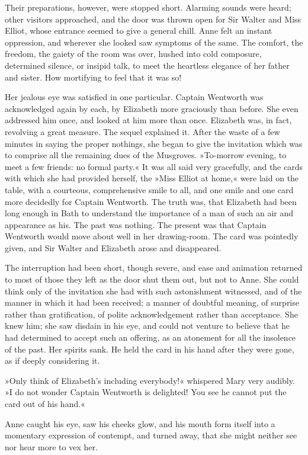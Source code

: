Their preparations, however, were stopped short. Alarming sounds were heard; other visitors approached, and the door was thrown open for Sir Walter and Miss Elliot, whose entrance seemed to give a general chill. Anne felt an instant oppression, and wherever she looked saw symptoms of the same. The comfort, the freedom, the gaiety of the room was over, hushed into cold composure, determined silence, or insipid talk, to meet the heartless elegance of her father and sister. How mortifying to feel that it was so!

Her jealous eye was satisfied in one particular. Captain Wentworth was acknowledged again by each, by Elizabeth more graciously than before. She even addressed him once, and looked at him more than once. Elizabeth was, in fact, revolving a great measure. The sequel explained it. After the waste of a few minutes in saying the proper nothings, she began to give the invitation which was to comprise all the remaining dues of the Musgroves. »To-morrow evening, to meet a few friends: no formal party.« It was all said very gracefully, and the cards with which she had provided herself, the »Miss Elliot at home,« were laid on the table, with a courteous, comprehensive smile to all, and one smile and one card more decidedly for Captain Wentworth. The truth was, that Elizabeth had been long enough in Bath to understand the importance of a man of such an air and appearance as his. The past was nothing. The present was that Captain Wentworth would move about well in her drawing-room. The card was pointedly given, and Sir Walter and Elizabeth arose and disappeared.

The interruption had been short, though severe, and ease and animation returned to most of those they left as the door shut them out, but not to Anne. She could think only of the invitation she had with such astonishment witnessed, and of the manner in which it had been received; a manner of doubtful meaning, of surprise rather than gratification, of polite acknowledgement rather than acceptance. She knew him; she saw disdain in his eye, and could not venture to believe that he had determined to accept such an offering, as an atonement for all the insolence of the past. Her spirits sank. He held the card in his hand after they were gone, as if deeply considering it.

»Only think of Elizabeth's including everybody!« whispered Mary very audibly. »I do not wonder Captain Wentworth is delighted! You see he cannot put the card out of his hand.«

Anne caught his eye, saw his cheeks glow, and his mouth form itself into a momentary expression of contempt, and turned away, that she might neither see nor hear more to vex her.

